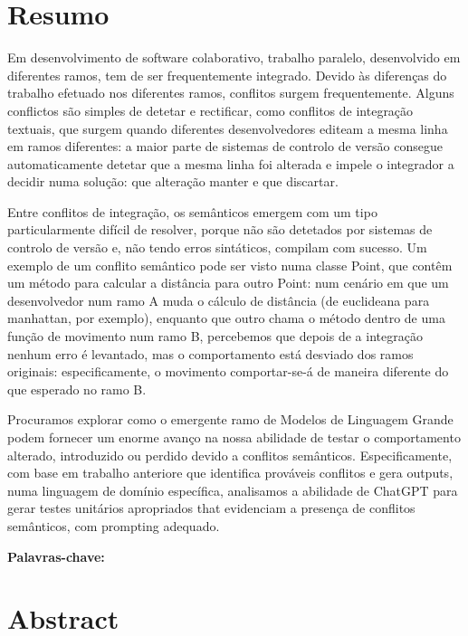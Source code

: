 \chapter*{Resumo}

Em desenvolvimento de software colaborativo, trabalho paralelo, desenvolvido em diferentes ramos, tem de ser frequentemente integrado. Devido às diferenças do trabalho efetuado nos diferentes ramos, conflitos surgem frequentemente. Alguns conflictos são simples de detetar e rectificar, como conflitos de integração textuais, que surgem quando diferentes desenvolvedores editeam a mesma linha em ramos diferentes: a maior parte de sistemas de controlo de versão consegue automaticamente detetar que a mesma linha foi alterada e impele o integrador a decidir numa solução: que alteração manter e que discartar.

Entre conflitos de integração, os semânticos emergem com um tipo particularmente difícil de resolver, porque não são detetados por sistemas de controlo de versão e, não tendo erros sintáticos, compilam com sucesso. Um exemplo de um conflito semântico pode ser visto numa classe Point, que contêm um método para calcular a distância para outro Point: num cenário em que um desenvolvedor num ramo A muda o cálculo de distância (de euclideana para manhattan, por exemplo), enquanto que outro chama o método dentro de uma função de movimento num ramo B, percebemos que depois de a integração nenhum erro é levantado, mas o comportamento está desviado dos ramos originais: especificamente, o movimento comportar-se-á de maneira diferente do que esperado no ramo B.

Procuramos explorar como o emergente ramo de Modelos de Linguagem Grande podem fornecer um enorme avanço na nossa abilidade de testar o comportamento alterado, introduzido ou perdido devido a conflitos semânticos.
Especificamente, com base em trabalho anteriore que identifica prováveis conflitos e gera outputs, numa linguagem de domínio específica, analisamos a abilidade de ChatGPT para gerar testes unitários apropriados that evidenciam a presença de conflitos semânticos, com prompting adequado.

\bigskip\noindent
\textbf{Palavras-chave:} 


\chapter*{Abstract}

